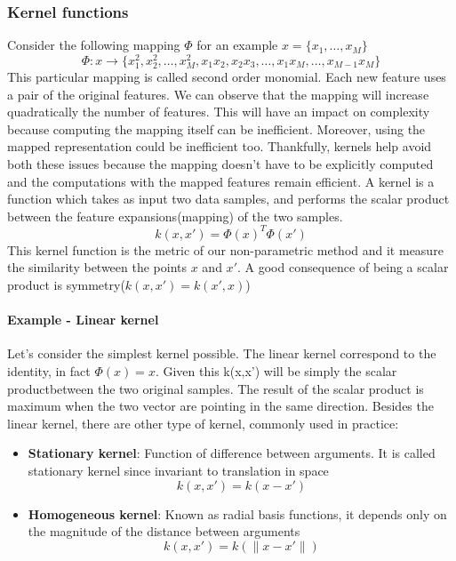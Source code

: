 \documentclass[../main.tex]{subfiles}
\begin{document}
\subsubsection{Kernel functions}
Consider the following mapping $\Phi$ for an example $x=\{x_1, \dots, x_M\}$
\begin{equation*}
    \Phi:x \rightarrow \{x_1^2,x_2^2,\dots,x_M^2,x_1x_2,x_2x_3, \dots,x_1x_M, \dots, x_{M-1}x_M\}
\end{equation*}
This particular mapping is called second order monomial. Each new feature uses a pair of the original features. We can observe that the mapping will increase quadratically the number of features. This will have an impact on complexity because computing the mapping itself can be inefficient. Moreover, using the mapped representation could be inefficient too.
Thankfully, kernels help avoid both these issues because the mapping doesn't have to be explicitly computed and the computations with the mapped features remain efficient.
A kernel is a function which takes as input two data samples, and performs the scalar product between the feature expansions(mapping) of the two samples.
\begin{equation}
    k(x,x') = \Phi(x)^T \Phi(x')
\end{equation}
This kernel function is the metric of our non-parametric method and it measure the similarity between the points $x$ and $x'$. A good consequence of being a scalar product is symmetry($k(x,x') = k(x',x)$)
\paragraph{Example - Linear kernel} Let's consider the simplest kernel possible. The linear kernel correspond to the identity, in fact $\Phi(x) = x$. Given this k(x,x') will be simply the scalar product\footnotemark between the two original samples. The result of the scalar product is maximum when the two vector are pointing in the same direction. 
\newline
Besides the linear kernel, there are other type of kernel, commonly used in practice:
\begin{itemize}
    \item \textbf{Stationary kernel}: Function of difference between arguments. It is called stationary kernel since invariant to translation in space
          \begin{equation*}
              k(x,x') = k(x-x')
          \end{equation*}
    \item \textbf{Homogeneous kernel}: Known as radial basis functions, it depends only on the magnitude of the distance between arguments
          \begin{equation*}
              k(x,x') = k(\|x-x'\|)
          \end{equation*}
\end{itemize}
\end{document}
